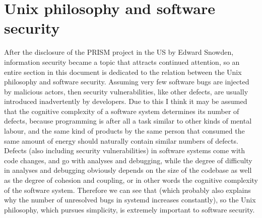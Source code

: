 \section{Unix philosophy and software security}\label{sec:security}

After the disclosure of the PRISM project in the US by Edward Snowden,
information security became a topic that attracts continued attention, so an
entire section in this document is dedicated to the relation between the Unix
philosophy and software security.  Assuming very few software bugs are injected
by malicious actors, then security vulnerabilities, like other defects, are
usually introduced inadvertently by developers.  Due to this I think it may
be assumed that the cognitive complexity of a software system determines its
number of defects, because programming is after all a task similar to other
kinds of mental labour, and the same kind of products by the same person that
consumed the same amount of energy should naturally contain similar numbers
of defects.  Defects (also including security vulnerabilities) in software
systems come with code changes, and go with analyses and debugging, while
the degree of difficulty in analyses and debugging obviously depends on
the size of the codebase as well as the degree of cohesion and coupling, or
in other words the cognitive complexity of the software system.  Therefore
we can see that  (which probably also explains why the number of unresolved
bugs in systemd increases constantly), so the Unix philosophy, which
pursues simplicity, is extremely important to software security.

